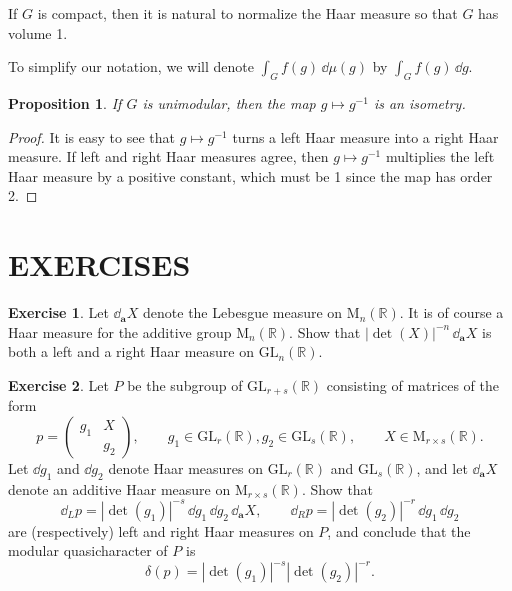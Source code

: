 \documentclass[12pt,reqno]{book}%
\newtheorem{proposition}{Proposition}[chapter]
\theoremstyle{definition}
\newtheorem{exercise}{Exercise}[chapter]
\theoremstyle{remark}
\theoremstyle{theorem}
\theoremstyle{remark}
\renewcommand{\d}{\dd}
\begin{document}
If $G$ is compact, then it is natural to normalize the Haar measure so that $G$ has volume 1.

To simplify our notation, we will denote $\displaystyle\int_{G} f(g) \, \d\mu(g)$ by $\displaystyle\int_{G} f(g) \, \d g$.

\begin{proposition}\label{}%
    If $G$ is unimodular, then the map $g \mapsto g^{-1}$ is an isometry.
\end{proposition}%
\begin{proof}%
    It is easy to see that $g \mapsto g^{-1}$ turns a left Haar measure into a right Haar measure.
    If left and right Haar measures agree, then $g \mapsto g^{-1}$ multiplies the left Haar measure by a positive constant, which must be 1 since the map has order 2.
\end{proof}%

\section*{EXERCISES}\label{}%
\begin{exercise}\label{}
    Let $\d_{\bm{a}}X$ denote the Lebesgue measure on $\mathrm{M}_{n}(\mathbb{R})$.
    It is of course a Haar measure for the additive group $\mathrm{M}_{n}(\mathbb{R})$.
    Show that $|\det(X)|^{-n} \, \d_{\bm{a}}X$ is both a left and a right Haar measure on $\mathrm{GL}_{n}(\mathbb{R})$.
\end{exercise}

\begin{exercise}\label{}
    Let $P$ be the subgroup of $\mathrm{GL}_{r+s}(\mathbb{R})$ consisting of matrices of the form
    \[
        p = \begin{pmatrix}
            g_1 & X  \\
            \ & g_2
        \end{pmatrix}
        , \qquad g_1 \in \mathrm{GL}_{r}(\mathbb{R}), g_2 \in \mathrm{GL}_{s}(\mathbb{R}), \qquad X \in \mathrm{M}_{r \times s}(\mathbb{R}).
    \]
    Let $\d g_1$ and $\d g_2$ denote Haar measures on $\mathrm{GL}_{r}(\mathbb{R})$ and $\mathrm{GL}_{s}(\mathbb{R})$, and let $\d_{\bm{a}}X$ denote an additive Haar measure on $\mathrm{M}_{r \times s}(\mathbb{R})$.
    Show that
    \[
        \d_L p = |\det(g_1)|^{-s} \, \d g_1 \, \d g_2 \, \d_{\bm{a}} X, \qquad \d_R p = |\det(g_2)|^{-r} \, \d g_1 \, \d g_2
    \]
    are (respectively) left and right Haar measures on $P$, and conclude that the modular quasicharacter of $P$ is
    \[
        \delta(p) = |\det(g_1)|^{-s} |\det(g_2)|^{-r}.
    \]
\end{exercise}
\end{document}
